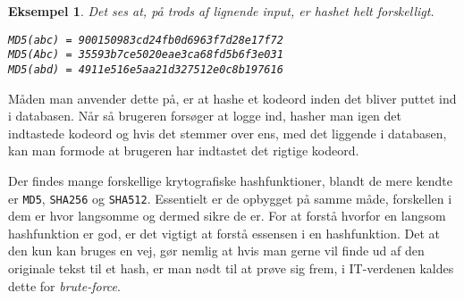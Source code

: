 \documentclass[a4paper, 12pt]{article}
\theoremstyle{break}
\newtheorem{eks}[definition]{Eksempel} %
\theoremstyle{breakline}
\theoremstyle{beviser}
\begin{document}
    \begin{eks}
        Det ses at, på trods af lignende input, er hashet helt forskelligt.
        \begin{center}
            \texttt{MD5(abc) = 900150983cd24fb0d6963f7d28e17f72}\\
            \texttt{MD5(Abc) = 35593b7ce5020eae3ca68fd5b6f3e031}\\
            \texttt{MD5(abd) = 4911e516e5aa21d327512e0c8b197616}\\
        \end{center}
        \label{eks:hash}

    \end{eks}


    Måden man anvender dette på, er at hashe et kodeord inden det bliver puttet ind i databasen.
    Når så brugeren forsøger at logge ind, hasher man igen det indtastede kodeord og hvis det stemmer over ens, med det liggende i databasen, kan man formode at brugeren har indtastet det rigtige kodeord.

    Der findes mange forskellige krytografiske hashfunktioner, blandt de mere kendte er \texttt{MD5}, \texttt{SHA256} og \texttt{SHA512}.
    Essentielt er de opbygget på samme måde, forskellen i dem er hvor langsomme og dermed sikre de er.
    For at forstå hvorfor en langsom hashfunktion er god, er det vigtigt at forstå essensen i en hashfunktion.
    Det at den kun kan bruges en vej, gør nemlig at hvis man gerne vil finde ud af den originale tekst til et hash, er man nødt til at prøve sig frem, i IT-verdenen kaldes dette for \emph{brute-force}.
\end{document}
